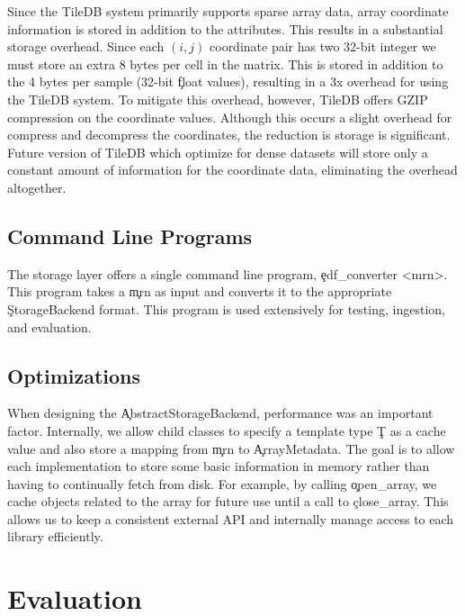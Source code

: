 Since the TileDB system primarily supports sparse array data, array coordinate
information is stored in addition to the attributes. This results in a
substantial storage overhead. Since each $(i, j)$ coordinate pair has two
32-bit integer we must store an extra 8 bytes per cell in the matrix. This is
stored in addition to the 4 bytes per sample (32-bit \c{float} values),
resulting in a 3x overhead for using the TileDB system. To mitigate this
overhead, however, TileDB offers GZIP compression on the coordinate values.
Although this occurs a slight overhead for compress and decompress the coordinates,
the reduction is storage is significant. \\

Future version of TileDB which optimize for dense datasets will store only a
constant amount of information for the coordinate data, eliminating the
overhead altogether.

\subsection{Command Line Programs}\label{storage-ch:implementation-cmd}

The storage layer offers a single command line program,
\c{edf\_converter <mrn>}.  This program takes a \c{mrn} as input
and converts it to the appropriate \c{StorageBackend} format. This
program is used extensively for testing, ingestion, and evaluation.

\subsection{Optimizations}\label{storage-ch:opt}

When designing the \c{AbstractStorageBackend}, performance was an important
factor. Internally, we allow child classes to specify a template type \c{T} as
a cache value and also store a mapping from \c{mrn} to \c{ArrayMetadata}. The
goal is to allow each implementation to store some basic information in memory
rather than having to continually fetch from disk. For example, by calling 
\c{open\_array}, we cache objects related to the array for future
use until a call to \c{close\_array}. This allows us to keep a consistent
external API and internally manage access to each library efficiently.

\section{Evaluation}\label{storage-ch:evaluation}

